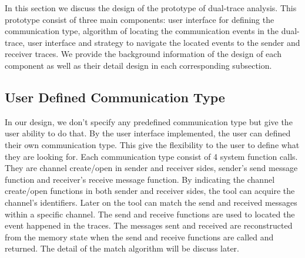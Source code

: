 \label{chapter:newsol}

In this section we discuss the design of the prototype of dual-trace analysis. This prototype consist of three main components: user interface for defining the communication type, algorithm of locating the communication events in the dual-trace, user interface and strategy to navigate the located events to the sender and receiver traces. We provide the background information of the design of each component as well as their detail design in each corresponding subsection.
\subsection{User Defined Communication Type}
In our design, we don't specify any predefined communication type but give the user ability to do that. By the user interface implemented, the user can defined their own communication type. This give the flexibility to the user to define what they are looking for. Each communication type consist of 4 system function calls. They are channel create/open in sender and receiver sides, sender's send message function and receiver's receive message function. By indicating the channel create/open functions in both sender and receiver sides, the tool can acquire the channel's identifiers. Later on the tool can match the send and received messages within a specific channel. The send and receive functions are used to located the event happened in the traces. The messages sent and received are reconstructed from the memory state when the send and receive functions are called and returned. The detail of the match algorithm will be discuss later.

